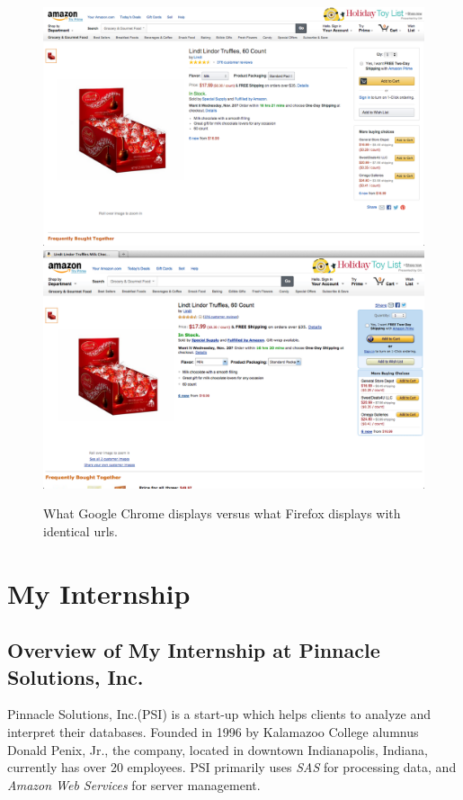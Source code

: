 \documentclass[12pt,twoside,draft]{report}
\begin{document}
\begin{figure}[htp]
\includegraphics[width=\textwidth]{lindt_chrome.png}
\includegraphics[width=\textwidth]{lindt_firefox.png}
\caption[Comparison of same url in different browsers]
{What Google Chrome displays versus what Firefox displays with identical urls.}
\end{figure}

\cleardoublepage
\chapter{My Internship}
\section{Overview of My Internship at Pinnacle Solutions, Inc.}
Pinnacle Solutions, Inc.(PSI) is a start-up which helps clients to analyze and interpret their databases. Founded in 1996 by Kalamazoo College alumnus Donald Penix, Jr., the company, located in downtown Indianapolis, Indiana, currently has over 20 employees. PSI primarily uses \textit{SAS} for processing data, and \textit{Amazon Web Services} for server management.
\end{document}
